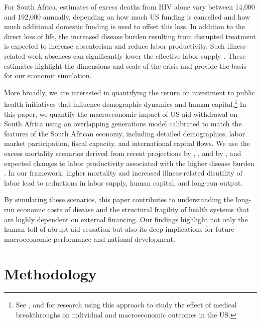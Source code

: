 \documentclass[letterpaper,12pt]{article}
\theoremstyle{definition}
\begin{document}
\begin{spacing}{1.5}
For South Africa, estimates of excess deaths from HIV alone vary between 14,000 and 192,000 annually, depending on how much US funding is cancelled and how much additional domestic funding is used to offset this loss. In addition to the direct loss of life, the increased disease burden resulting from disrupted treatment is expected to increase absenteeism and reduce labor productivity. Such illness-related work absences can significantly lower the effective labor supply \citep{Keogh2024,Panda2024}. These estimates highlight the dimensions and scale of the crisis and provide the basis for our economic simulation.

More broadly, we are interested in quantifying the return on investment to public health initiatives that influence demographic dynamics and human capital.\footnote{See \citet{DeBackerEtAl:2025}, and \citet{RomanniEtAl:forthcoming} for research using this approach to study the effect of medical breakthroughs on individual and macroeconomic outcomes in the US.} In this paper, we quantify the macroeconomic impact of US aid withdrawal on South Africa using an overlapping generations model calibrated to match the features of the South African economy, including detailed demographics, labor market participation, fiscal capacity, and international capital flows. We use the excess mortality scenarios derived from recent projections by \citet{Brink2025}, \citet{Gandhi2025}, and by \citet{KS2025}, and expected changes to labor productivity associated with the higher disease burden \citep{Keogh2024,Panda2024}. In our framework, higher mortality and increased illness-related disutility of labor lead to reductions in labor supply, human capital, and long-run output.

By simulating these scenarios, this paper contributes to understanding the long-run economic costs of disease and the structural fragility of health systems that are highly dependent on external financing. Our findings highlight not only the human toll of abrupt aid cessation but also its deep implications for future macroeconomic performance and national development.


\section{Methodology}\label{SecMethod}


\end{spacing}
\end{document}
